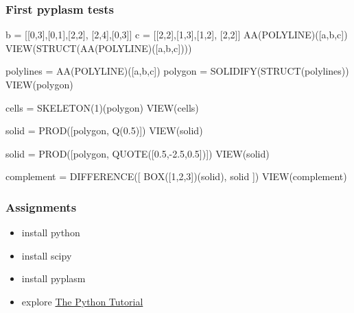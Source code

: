 \documentclass[ignorenonframetext,]{beamer}
\def\emph#1{{\color{cyan}#1}}
\begin{document}
\begin{frame}[fragile]\frametitle{First pyplasm tests}

\begin{python}
b = [[0,3],[0,1],[2,2],
 [2,4],[0,3]]
c = [[2,2],[1,3],[1,2],
 [2,2]]
AA(POLYLINE)([a,b,c])
VIEW(STRUCT(AA(POLYLINE)([a,b,c])))

polylines = AA(POLYLINE)([a,b,c])
polygon = SOLIDIFY(STRUCT(polylines))
VIEW(polygon)

cells = SKELETON(1)(polygon)
VIEW(cells)

solid = PROD([polygon, Q(0.5)])
VIEW(solid)

solid = PROD([polygon, QUOTE([0.5,-2.5,0.5])])
VIEW(solid)

complement = DIFFERENCE([ BOX([1,2,3])(solid), solid ])
VIEW(complement)
\end{python}

\end{frame}

\begin{frame}\frametitle{Assignments}

\begin{itemize}
\itemsep1pt\parskip0pt
\item
  install python
\item
  install scipy
\item
  install pyplasm
\item
  explore \href{http://docs.python.org/2/tutorial/}{\emph{The Python
  Tutorial}}
\end{itemize}

\end{frame}
\end{document}

